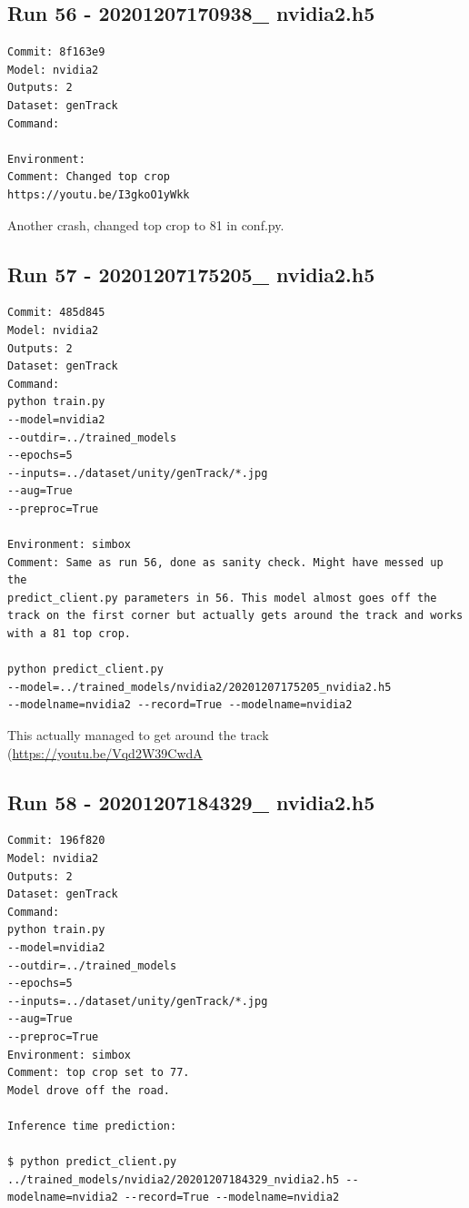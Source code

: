 \subsection{Run 56 - 20201207170938\_ nvidia2.h5}
\begin{verbatim}
Commit: 8f163e9
Model: nvidia2
Outputs: 2
Dataset: genTrack
Command:

Environment: 
Comment: Changed top crop
https://youtu.be/I3gkoO1yWkk
\end{verbatim}

Another crash, changed top crop to 81 in conf.py.

\subsection{Run 57 - 20201207175205\_ nvidia2.h5}
\begin{verbatim}
Commit: 485d845
Model: nvidia2
Outputs: 2
Dataset: genTrack
Command:
python train.py
--model=nvidia2
--outdir=../trained_models
--epochs=5
--inputs=../dataset/unity/genTrack/*.jpg
--aug=True
--preproc=True

Environment: simbox
Comment: Same as run 56, done as sanity check. Might have messed up the 
predict_client.py parameters in 56. This model almost goes off the track on the first corner but actually gets around the track and works with a 81 top crop.

python predict_client.py 
--model=../trained_models/nvidia2/20201207175205_nvidia2.h5 
--modelname=nvidia2 --record=True --modelname=nvidia2
\end{verbatim}

This actually managed to get around the track (\url{https://youtu.be/Vqd2W39CwdA}

\subsection{Run 58 - 20201207184329\_ nvidia2.h5}
\begin{verbatim}
Commit: 196f820
Model: nvidia2
Outputs: 2
Dataset: genTrack
Command:
python train.py 
--model=nvidia2
--outdir=../trained_models
--epochs=5
--inputs=../dataset/unity/genTrack/*.jpg
--aug=True
--preproc=True
Environment: simbox
Comment: top crop set to 77. 
Model drove off the road.

Inference time prediction:

$ python predict_client.py ../trained_models/nvidia2/20201207184329_nvidia2.h5 --modelname=nvidia2 --record=True --modelname=nvidia2
\end{verbatim}

